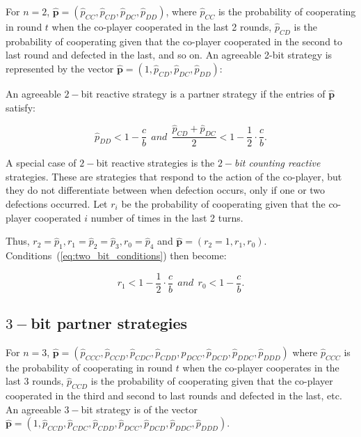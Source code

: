 \documentclass{article}
\theoremstyle{definition}
\begin{document}
For $n=2$, $\mathbf{\hat{p}}=(\hat{p}_{CC}, \hat{p}_{CD}, \hat{p}_{DC}, \hat{p}_{DD})$, where
$\hat{p}_{CC}$ is the probability of cooperating in round \(t\) when the
co-player cooperated in the last 2 rounds, $\hat{p}_{CD}$ is the probability of
cooperating given that the co-player cooperated in the second to last round and
defected in the last, and so on. An agreeable 2-bit strategy is represented by
the vector $\mathbf{\hat{p}}=(1, \hat{p}_{CD}, \hat{p}_{DC}, \hat{p}_{DD})$:

An agreeable $2-$bit reactive strategy is a partner strategy if the entries of
$\mathbf{\hat{p}}$ satisfy:

\begin{equation}\label{eq:two_bit_conditions}
  \displaystyle \hat{p}_{DD} < 1\!-\! \frac{c}{b}  ~~and~~ \displaystyle \frac{\hat{p}_{CD} + \hat{p}_{DC}}{2} < 1- \frac{1}{2} \cdot \frac{c}{b}.
\end{equation}

A special case of $2-$bit reactive strategies is the {\it $2-$bit counting
reactive} strategies. These are strategies that respond to the action of the
co-player, but they do not differentiate between when defection occurs, only if
one or two defections occurred. Let \(r_i\) be the probability of cooperating
given that the co-player cooperated \(i\) number of times in the last 2 turns.

Thus, $r_2 = \hat{p}_1, r_1 = \hat{p}_2 =  \hat{p}_3, r_0 = \hat{p}_4$ and
$\mathbf{\hat{p}}=(r_2=1, r_1, r_0)$. Conditions~(\ref{eq:two_bit_conditions})
then become:

\begin{equation}\label{eq:counting_two_bit_conditions}
  \displaystyle r_1 < 1-\frac{1}{2} \cdot \frac{c}{b} ~~and~~ r_0 < 1\!-\! \frac{c}{b}.
\end{equation}

\subsection{$3-$bit partner strategies}

For $n=3$, $\mathbf{\hat{p}}=(\hat{p}_{CCC}, \hat{p}_{CCD}, \hat{p}_{CDC},
\hat{p}_{CDD}, \hat{p}_{DCC}, \hat{p}_{DCD}, \hat{p}_{DDC}, \hat{p}_{DDD})$
where $\hat{p}_{CCC}$ is the probability of cooperating in round $t$ when the
co-player cooperates in the last 3 rounds, $\hat{p}_{CCD}$ is the probability of
cooperating given that the co-player cooperated in the third and second to last
rounds and defected in the last, etc. An agreeable $3-$bit strategy is of the
vector $\mathbf{\hat{p}}=(1, \hat{p}_{CCD}, \hat{p}_{CDC}, \hat{p}_{CDD},
\hat{p}_{DCC}, \hat{p}_{DCD}, \hat{p}_{DDC}, \hat{p}_{DDD})$.
\end{document}

